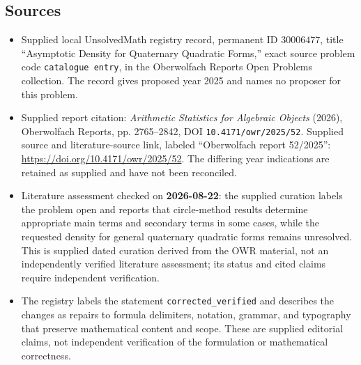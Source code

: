 \documentclass[11pt]{article}
\begin{document}
\subsection{Sources}
\begin{itemize}
\item Supplied local UnsolvedMath registry record, permanent ID \(30006477\), title ``Asymptotic Density for Quaternary Quadratic Forms,'' exact source problem code \texttt{catalogue entry}, in the Oberwolfach Reports Open Problems collection. The record gives proposed year 2025 and names no proposer for this problem.
\item Supplied report citation: \emph{Arithmetic Statistics for Algebraic Objects} (2026), Oberwolfach Reports, pp. 2765--2842, DOI \texttt{10.4171/owr/2025/52}. Supplied source and literature-source link, labeled ``Oberwolfach report 52/2025'': \url{https://doi.org/10.4171/owr/2025/52}. The differing year indications are retained as supplied and have not been reconciled.
\item Literature assessment checked on \textbf{2026-08-22}: the supplied curation labels the problem open and reports that circle-method results determine appropriate main terms and secondary terms in some cases, while the requested density for general quaternary quadratic forms remains unresolved. This is supplied dated curation derived from the OWR material, not an independently verified literature assessment; its status and cited claims require independent verification.
\item The registry labels the statement \texttt{corrected\_verified} and describes the changes as repairs to formula delimiters, notation, grammar, and typography that preserve mathematical content and scope. These are supplied editorial claims, not independent verification of the formulation or mathematical correctness.
\end{itemize}
\end{document}
